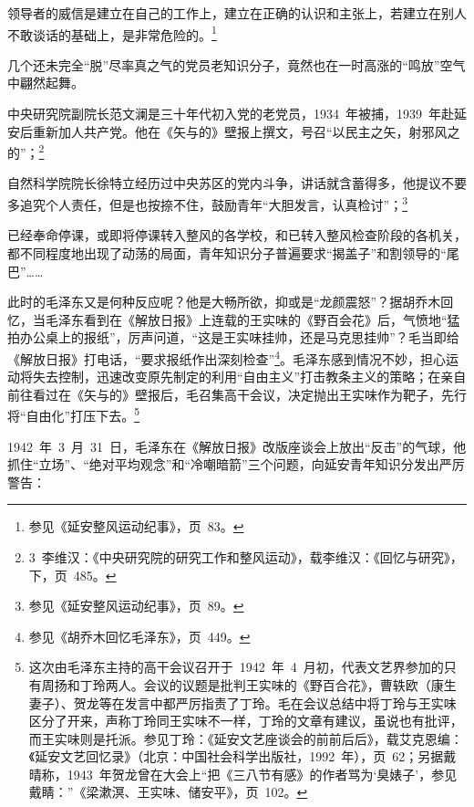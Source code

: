\begin{quoting}
领导者的威信是建立在自己的工作上，建立在正确的认识和主张上，若建立在别人不敢谈话的基础上，是非常危险的。\footnote{参见《延安整风运动纪事》，页~83。}
\end{quoting}几个还未完全“脱”尽率真之气的党员老知识分子，竟然也在一时高涨的“鸣放”空气中翩然起舞。

中央研究院副院长范文澜是三十年代初入党的老党员，1934~年被捕，1939~年赴延安后重新加人共产党。他在《矢与的》壁报上撰文，号召“以民主之矢，射邪风之的”；\footnote{3~李维汉：《中央研究院的研究工作和整风运动》，载李维汉：《回忆与研究》，下，页~485。}

自然科学院院长徐特立经历过中央苏区的党内斗争，讲话就含蓄得多，他提议不要多追究个人责任，但是也按捺不住，鼓励青年“大胆发言，认真检讨”；\footnote{参见《延安整风运动纪事》，页~89。}

已经奉命停课，或即将停课转入整风的各学校，和已转入整风检查阶段的各机关，都不同程度地出现了动荡的局面，青年知识分子普遍要求“揭盖子”和割领导的“尾巴”……

此时的毛泽东又是何种反应呢？他是大畅所欲，抑或是“龙颜震怒”？据胡乔木回忆，当毛泽东看到在《解放日报》上连载的王实味的《野百会花》后，气愤地“猛拍办公桌上的报纸”，厉声问道，“这是王实味挂帅，还是马克思挂帅”？毛当即给《解放日报》打电话，“要求报纸作出深刻检查”\footnote{参见《胡乔木回忆毛泽东》，页~449。}。毛泽东感到情况不妙，担心运动将失去控制，迅速改变原先制定的利用“自由主义”打击教条主义的策略；在亲自前往看过在《矢与的》壁报后，毛召集高干会议，决定抛出王实味作为靶子，先行将“自由化”打压下去。\footnote{这次由毛泽东主持的高干会议召开于~1942~年~4~月初，代表文艺界参加的只有周扬和丁玲两人。会议的议题是批判王实味的《野百合花》，曹轶欧（康生妻子）、贺龙等在发言中都严厉指责了丁玲。毛在会议总结中将丁玲与王实味区分了开来，声称丁玲同王实味不一样，丁玲的文章有建议，虽说也有批评，而王实味则是托派。参见丁玲：《延安文艺座谈会的前前后后》，载艾克恩编：《延安文艺回忆录》（北京：中国社会科学出版社，1992~年），页~62；另据戴晴称，1943~年贺龙曾在大会上“把《三八节有感》的作者骂为‘臭婊子’，参见戴睛：”《梁漱溟、王实味、储安平》，页~102。}

1942~年~3~月~31~日，毛泽东在《解放日报》改版座谈会上放出“反击”的气球，他抓住“立场”、“绝对平均观念”和“冷嘲暗箭”三个问题，向延安青年知识分发出严厉警告：

